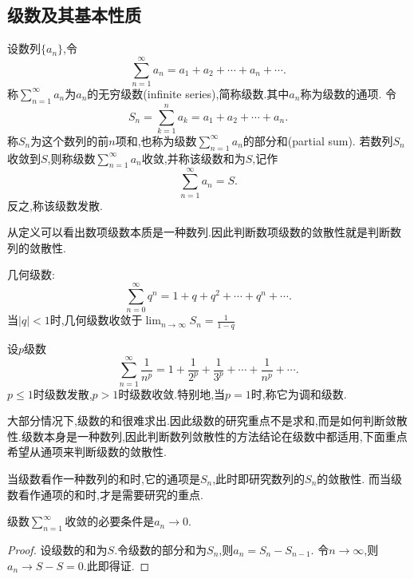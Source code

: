 \subsection{级数及其基本性质}

\begin{definition}[无穷级数]
    设数列$\{a_n\}$,令
    \[\sum_{n=1}^\infty a_n=a_1+a_2+\cdots+a_n+\cdots.\]
    称$\sum_{n=1}^\infty a_n$为$a_n$的无穷级数(infinite series),简称级数.其中$a_n$称为级数的通项.
    令\[S_n=\sum_{k=1}^n a_k=a_1+a_2+\cdots+a_n.\]
    称$S_n$为这个数列的前$n$项和,也称为级数$\sum_{n=1}^\infty a_n$的部分和(partial sum).
    若数列${S_n}$收敛到$S$,则称级数$\sum_{n=1}^\infty a_n$收敛,并称该级数和为$S$,记作\[\sum_{n=1}^\infty a_n=S.\]
    反之,称该级数发散.
\end{definition}

从定义可以看出数项级数本质是一种数列.因此判断数项级数的敛散性就是判断数列的敛散性.

\begin{example}[几何级数]
    几何级数:
    \[\sum_{n=0}^\infty q^n=1+q+q^2+\cdots+q^n+\cdots.\]
    当$|q|<1$时,几何级数收敛于$\lim_{n\to\infty}S_n=\frac{1}{1-q}$
\end{example}

\begin{example}[$p$级数]
    设$p$级数
    \[\sum_{n=1}^\infty\frac{1}{n^p}=1+\frac{1}{2^p}+\frac{1}{3^p}+\cdots+\frac{1}{n^p}+\cdots.\]
    $p\leqslant 1$时级数发散,$p>1$时级数收敛.特别地,当$p=1$时,称它为调和级数.
\end{example}

大部分情况下,级数的和很难求出.因此级数的研究重点不是求和,而是如何判断敛散性.级数本身是一种数列,因此判断数列敛散性的方法结论在级数中都适用,下面重点希望从通项来判断级数的敛散性.

\begin{note}
    当级数看作一种数列的和时,它的通项是$S_n$,此时即研究数列的$S_n$的敛散性.
    而当级数看作通项的和时,才是需要研究的重点.
\end{note}

\begin{proposition}[级数收敛的必要条件]
    级数$\sum_{n=1}^{\infty}$收敛的必要条件是$a_n\to 0.$    
\end{proposition}

\begin{proof}
    设级数的和为$S$.令级数的部分和为$S_n$,则$a_n=S_n-S_{n-1}$.
    令$n\to\infty$,则$a_n\to S-S=0.$此即得证.
\end{proof}

